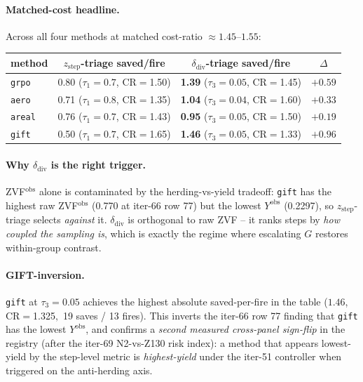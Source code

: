 \documentclass{article}
\begin{document}
\paragraph{Matched-cost headline.}
Across all four methods at matched cost-ratio $\approx 1.45$--$1.55$:
\begin{center}
\begin{tabular}{lccc}
\toprule
method & $z_{\mathrm{step}}$-triage saved/fire & $\delta_{\mathrm{div}}$-triage saved/fire & $\Delta$ \\
\midrule
\texttt{grpo}  & 0.80 ($\tau_1{=}0.7$, CR$=$1.50) & \textbf{1.39} ($\tau_3{=}0.05$, CR$=$1.45) & $+0.59$ \\
\texttt{aero}  & 0.71 ($\tau_1{=}0.8$, CR$=$1.35) & \textbf{1.04} ($\tau_3{=}0.04$, CR$=$1.60) & $+0.33$ \\
\texttt{areal} & 0.76 ($\tau_1{=}0.7$, CR$=$1.43) & \textbf{0.95} ($\tau_3{=}0.05$, CR$=$1.50) & $+0.19$ \\
\texttt{gift}  & 0.50 ($\tau_1{=}0.7$, CR$=$1.65) & \textbf{1.46} ($\tau_3{=}0.05$, CR$=$1.33) & $+0.96$ \\
\bottomrule
\end{tabular}
\end{center}

\paragraph{Why $\delta_{\mathrm{div}}$ is the right trigger.}
ZVF$^{\mathrm{obs}}$ alone is contaminated by the herding-vs-yield
tradeoff: \texttt{gift} has the highest raw ZVF$^{\mathrm{obs}}$ (0.770
at iter-66 row 77) but the lowest $Y^{\mathrm{obs}}$ (0.2297), so
$z_{\mathrm{step}}$-triage selects \emph{against} it.
$\delta_{\mathrm{div}}$ is orthogonal to raw ZVF -- it ranks steps by
\emph{how coupled the sampling is}, which is exactly the regime where
escalating $G$ restores within-group contrast.

\paragraph{GIFT-inversion.}
\texttt{gift} at $\tau_3{=}0.05$ achieves the highest absolute
saved-per-fire in the table ($1.46$, CR$=$1.325$,$ 19 saves / 13 fires).
This inverts the iter-66 row 77 finding that \texttt{gift} has the lowest
$Y^{\mathrm{obs}}$, and confirms a \emph{second measured cross-panel
sign-flip} in the registry (after the iter-69 N2-vs-Z130 risk index):
a method that appears lowest-yield by the step-level metric is
\emph{highest-yield} under the iter-51 controller when triggered on the
anti-herding axis.
\end{document}
